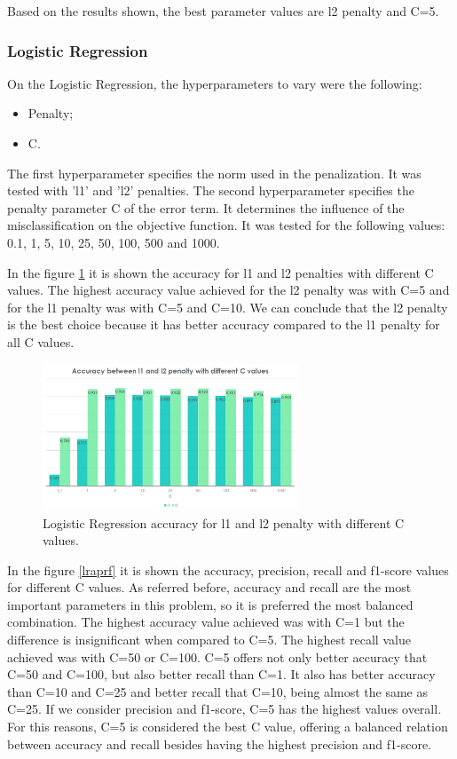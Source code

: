 \documentclass[journal]{IEEEtran}
\begin{document}
Based on the results shown, the best parameter values are l2 penalty and C=5.

\subsubsection{Logistic Regression}
On the Logistic Regression, the hyperparameters to vary were the following:
\begin{itemize}
\item Penalty;
\item C.
\end{itemize}

The first hyperparameter specifies the norm used in the penalization. It was tested with 'l1' and 'l2' penalties. The second hyperparameter specifies the penalty parameter C of the error term. It determines the influence of the misclassification on the objective function. It was tested for the following values: 0.1, 1, 5, 10, 25, 50, 100, 500 and 1000.

In the figure \ref{lraccuracy} it is shown the accuracy for l1 and l2 penalties with different C values. The highest accuracy value achieved for the l2 penalty was with C=5 and for the l1 penalty was with C=5 and C=10. We can conclude that the l2 penalty is the best choice because it has better accuracy compared to the l1 penalty for all C values.

\begin{figure}[!t]
\centering
\includegraphics[width=3in]{lr1_w}
\caption{Logistic Regression accuracy for l1 and l2 penalty with different C values.}
\label{lraccuracy}
\end{figure}

In the figure \ref{lraprf} it is shown the accuracy, precision, recall and f1-score values for different C values. As referred before, accuracy and recall are the most important parameters in this problem, so it is preferred the most balanced combination. The highest accuracy value achieved was with C=1 but the difference is insignificant when compared to C=5. The highest recall value achieved was with C=50 or C=100. C=5 offers not only better accuracy that C=50 and C=100, but also better recall than C=1. It also has better accuracy than C=10 and C=25 and better recall that C=10, being almost the same as C=25. If we consider precision and f1-score, C=5 has the highest values overall. For this reasons, C=5 is considered the best C value, offering a balanced relation between accuracy and recall besides having the highest precision and f1-score.
\end{document}
